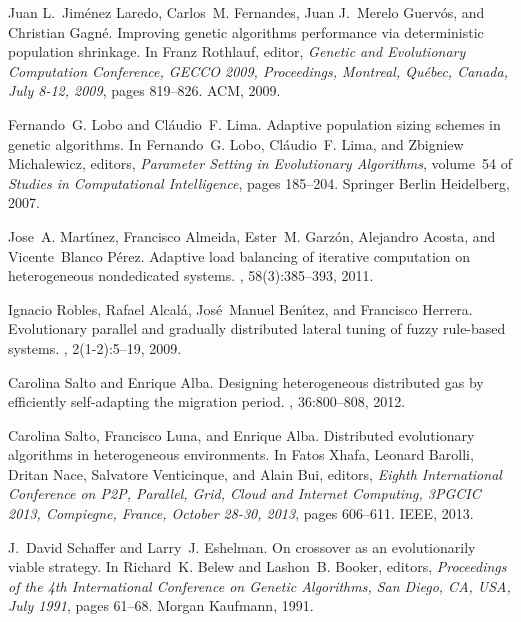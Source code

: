 \documentclass[final,1p,times]{elsarticle}
\begin{document}
\begin{thebibliography}{10}
Juan L.~Jim{\'{e}}nez Laredo, Carlos~M. Fernandes, Juan
  J.~Merelo Guerv{\'{o}}s, and Christian Gagn{\'{e}}.
\newblock Improving genetic algorithms performance via deterministic population
  shrinkage.
\newblock In Franz Rothlauf, editor, {\em Genetic and Evolutionary Computation
  Conference, {GECCO} 2009, Proceedings, Montreal, Qu{\'{e}}bec, Canada, July
  8-12, 2009}, pages 819--826. {ACM}, 2009.

Fernando~G. Lobo and Cl\'{a}udio~F. Lima.
\newblock Adaptive population sizing schemes in genetic algorithms.
\newblock In Fernando~G. Lobo, Cl\'{a}udio~F. Lima, and Zbigniew Michalewicz,
  editors, {\em Parameter Setting in Evolutionary Algorithms}, volume~54 of
  {\em Studies in Computational Intelligence}, pages 185--204. Springer Berlin
  Heidelberg, 2007.

Jose~A. Mart{\'{\i}}nez, Francisco Almeida, Ester~M. Garz{\'{o}}n, Alejandro
  Acosta, and Vicente~Blanco P{\'{e}}rez.
\newblock Adaptive load balancing of iterative computation on heterogeneous
  nondedicated systems.
, 58(3):385--393, 2011.

Ignacio Robles, Rafael Alcal{\'{a}}, Jos{\'{e}}~Manuel Ben{\'{\i}}tez, and
  Francisco Herrera.
\newblock Evolutionary parallel and gradually distributed lateral tuning of
  fuzzy rule-based systems.
, 2(1-2):5--19, 2009.

Carolina Salto and Enrique Alba.
\newblock Designing heterogeneous distributed gas by efficiently self-adapting
  the migration period.
, 36:800--808, 2012.

Carolina Salto, Francisco Luna, and Enrique Alba.
\newblock Distributed evolutionary algorithms in heterogeneous environments.
\newblock In Fatos Xhafa, Leonard Barolli, Dritan Nace, Salvatore Venticinque,
  and Alain Bui, editors, {\em Eighth International Conference on P2P,
  Parallel, Grid, Cloud and Internet Computing, 3PGCIC 2013, Compiegne, France,
  October 28-30, 2013}, pages 606--611. {IEEE}, 2013.

J.~David Schaffer and Larry~J. Eshelman.
\newblock On crossover as an evolutionarily viable strategy.
\newblock In Richard~K. Belew and Lashon~B. Booker, editors, {\em Proceedings
  of the 4th International Conference on Genetic Algorithms, San Diego, CA,
  USA, July 1991}, pages 61--68. Morgan Kaufmann, 1991.


\end{thebibliography}
\end{document}
